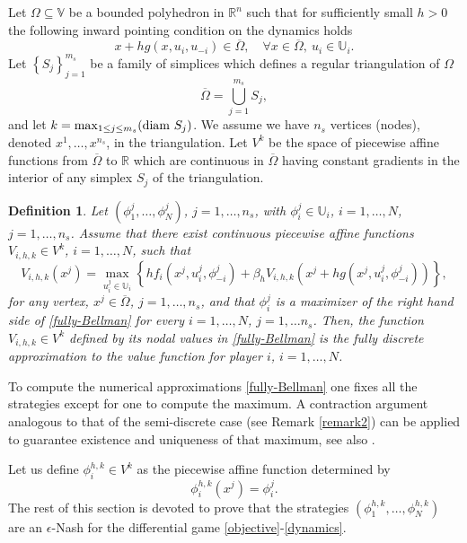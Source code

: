 \documentclass[12pt]{article}
\newtheorem{definition}{Definition}
\newcounter{remark}
\begin{document}
Let $ \Omega\subseteq\mathbb{V}$ be a bounded polyhedron in $\mathbb R^n$ such that for sufficiently small $h>0$ {the following inward pointing condition on the dynamics} holds
\begin{equation}\label{invariance}
x+hg(x,u_i,u_{-i})\in \overline \Omega,\quad \forall x \in \overline \Omega, \ u_i\in \mathbb{U}_i.
\end{equation}
Let $\left\{S_j\right\}_{j=1}^{m_s}$ be a family of simplices which defines a regular triangulation of $\Omega$
$$
\overline \Omega=\bigcup_{j=1}^{m_s} S_j,
$$
and let $ k=\max_{1\le j\le m_s}({\rm diam} \ S_j)$. We assume we have $n_s$ vertices (nodes), denoted $x^1,\ldots,x^{n_s}$, in the triangulation. Let $V^k$ be the space of piecewise affine functions from $\overline \Omega$ to ${\mathbb R}$ which are continuous in $\overline \Omega$ having constant gradients in the interior of any simplex $S_j$ of the triangulation.
\begin{definition}\label{definition_piecewise_value_approximation}
Let $(\phi_1^j,\ldots,\phi_N^j)$, $j=1,\ldots,n_s$, with $\phi_i^j\in {\mathbb U}_i$, $i=1,\dots, N$, $j=1,\ldots,n_s$.
Assume that there exist continuous piecewise affine functions $V_{i,h,k}\in V^k$, $i=1,\dots,N$, such that
\begin{equation}\label{fully-Bellman}
 V_{i,h,k}(x^j)=\max_{u_i^j\in\mathbb{U}_i}\left\{hf_i(x^j,u_{i}^j,\phi_{-i}^j)+\beta_h V_{i,h,k}(x^j+hg(x^j,u_{i}^j,\phi_{-i}^j))\right\},
\end{equation}
for any vertex,  $x^j\in \overline \Omega$, $j=1,\ldots,n_s$, and that $\phi_i^j$  is a maximizer of the right hand side of \eqref{fully-Bellman} for every $i=1,\dots,N$, $j=1,\dots n_s$.
Then, the function $V_{i,h,k}\in V^k$ defined
by its nodal values in \eqref{fully-Bellman} is the fully discrete approximation to the value function for player $i$, $i=1,\dots, N$.
\end{definition}
{To compute the numerical approximations \eqref{fully-Bellman} one fixes all the strategies except for one
to compute the maximum. A contraction argument analogous to that of the semi-discrete case (see Remark \ref{remark2}) can be applied to
guarantee existence and uniqueness of that maximum, see also \cite[Theorem 1.1, Appendix A]{Bardi}}.

Let us define $\phi_i^{h,k}\in V^k$ as the piecewise affine function determined by
\begin{equation}\label{piecewise_linear_epsilon_Nash}
\phi_i^{h,k}(x^j)=\phi_i^j.
\end{equation}
The rest of this section is devoted to prove that the strategies $(\phi_1^{h,k},\dots,\phi_N^{h,k})$ are an $\epsilon$-Nash for the differential game \eqref{objective}-\eqref{dynamics}.
\end{document}
